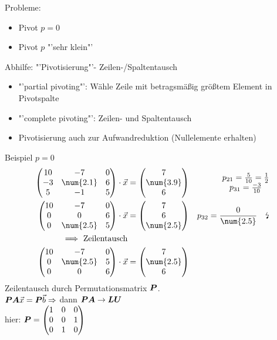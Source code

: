 Probleme:
\begin{itemize}
	\item Pivot $p = 0$ \lightning\lightning
	\item Pivot $p$ "'sehr klein"'
\end{itemize}
Abhilfe: "'Pivotisierung"'- Zeilen-/Spaltentausch
\begin{itemize}
	\item "'partial pivoting"': Wähle Zeile mit betragsmäßig größtem Element in Pivotspalte
	\item "'complete pivoting"': Zeilen- und Spaltentausch
	\item Pivotisierung auch zur Aufwandreduktion (Nullelemente erhalten)
\end{itemize}

Beispiel $p = 0$
\begin{align}
	\begin{pmatrix}
	10 & -7 & 0 \\
	-3 & \num{2.1} & 6 \\
	5 & -1 & 5
	\end{pmatrix}\cdot\vec{x} &= \begin{pmatrix}
	7\\ \num{3.9}\\ 6
	\end{pmatrix}& \begin{matrix}
	p_{21} = \frac{5}{10} = \frac{1}{2}\\ p_{31} = \frac{-3}{10}
	\end{matrix}\\
	\begin{pmatrix}
	10 & -7 & 0 \\
	0 & 0 & 6 \\
	0 & \num{2.5} & 5
	\end{pmatrix}\cdot\vec{x}& = \begin{pmatrix}
	7\\ 6\\ \num{2.5}
	\end{pmatrix}& p_{32} = \frac{0}{\num{2.5}}\quad\text{\lightning}\\
	\Longrightarrow\text{ Zeilentausch}\\
	\begin{pmatrix}
	10 & -7 & 0 \\
	0 & \num{2.5} & 5 \\
	0 & 0 & 6
	\end{pmatrix}\cdot\vec{x}& = \begin{pmatrix}
	7\\ \num{2.5}\\ 6
	\end{pmatrix}
\end{align}
Zeilentausch durch Permutationsmatrix $\boldsymbol {P}$.\\
$\boldsymbol {P}\boldsymbol {A}\vec{x} = \boldsymbol {P}\vec{b}\Rightarrow$ dann $\boldsymbol {P}\boldsymbol {A}\rightarrow\boldsymbol {L}\boldsymbol {U}$\\
hier: $\boldsymbol {P} = \begin{pmatrix}
1 & 0 & 0\\ 0 & 0 & 1\\ 0 & 1 & 0
\end{pmatrix}$


